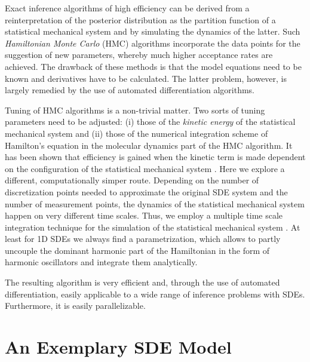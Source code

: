 \documentclass[12pt,a4paper,final]{iopart}
\begin{document}
Exact inference algorithms of high efficiency can be derived from a reinterpretation of the posterior distribution as the partition function of a statistical mechanical system and by simulating the dynamics of the latter.
Such {\em Hamiltonian Monte Carlo} (HMC) algorithms \cite{duane_1987} incorporate the data points for the suggestion of new parameters, whereby much higher acceptance rates are achieved.
The drawback of these methods is that the model equations need to be known and derivatives have to be calculated. The latter problem, however, is largely remedied by the use of automated differentiation algorithms.

Tuning of HMC algorithms is a non-trivial matter.
Two sorts of tuning parameters need to be adjusted: (i) those of the {\em kinetic energy} of the statistical mechanical system and (ii) those of the numerical integration scheme of Hamilton's equation in the molecular dynamics part of the HMC algorithm.
It has been shown that efficiency is gained when the kinetic term is made dependent on the configuration of the statistical mechanical system \cite{girolami_2011_HMC}.
Here we explore a different, computationally simper route.
Depending on the number of discretization points needed to approximate the original SDE system and the number of measurement points, the dynamics of the statistical mechanical system happen on very different time scales.
Thus, we employ a multiple time scale integration technique for the simulation of the statistical mechanical system \cite{tuckerman_1993}.
At least for 1D SDEs we always find a parametrization, which allows to partly uncouple the dominant harmonic part of the Hamiltonian in the form of harmonic oscillators and integrate them analytically.

The resulting algorithm is very efficient and, through the use of automated differentiation, easily applicable to a wide range of inference problems with SDEs.
Furthermore, it is easily parallelizable.

\section{An Exemplary SDE Model}
\end{document}
